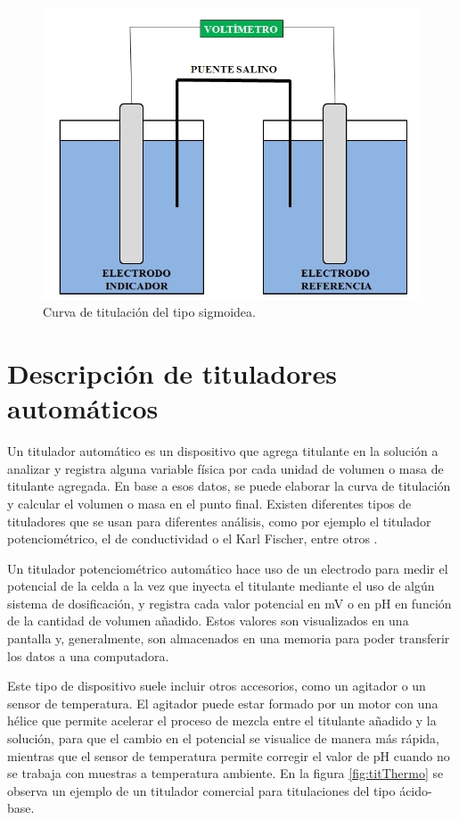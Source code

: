 \begin{figure}[htbp]
	\centering
	\includegraphics[width=.5\textwidth]{./Figures/Potenciometria-img.jpg}
	\caption{Curva de titulación del tipo sigmoidea\protect\footnotemark.}
	\label{fig:potenciometria}
\end{figure}

\section{Descripción de tituladores automáticos}
\label{tituladoresAutomaticos}

Un titulador automático es un dispositivo que agrega titulante en la solución a analizar y registra alguna variable física por cada unidad de volumen o masa de titulante agregada. En base a esos datos, se puede elaborar la curva de titulación y calcular el volumen o masa en el punto final.
Existen diferentes tipos de tituladores que se usan para diferentes análisis, como por ejemplo el titulador potenciométrico, el de conductividad o el Karl Fischer, entre otros \citep{BOOK:2}.

Un titulador potenciométrico automático hace uso de un electrodo para medir el potencial de la celda a la vez que inyecta el titulante mediante el uso de algún sistema de dosificación, y registra cada valor potencial en mV o en pH en función de la cantidad de volumen añadido. Estos valores son visualizados en una pantalla y, generalmente, son almacenados en una memoria para poder transferir los datos a una computadora. 

Este tipo de dispositivo suele incluir otros accesorios, como un agitador o un sensor de temperatura. El agitador puede estar formado por un motor con una hélice que permite acelerar el proceso de mezcla entre el titulante añadido y la solución, para que el cambio en el potencial se visualice de manera más rápida, mientras que el sensor de temperatura permite corregir el valor de pH cuando no se trabaja con muestras a temperatura ambiente. En la figura \ref{fig:titThermo} se observa un ejemplo de un titulador comercial para titulaciones del tipo ácido-base.

